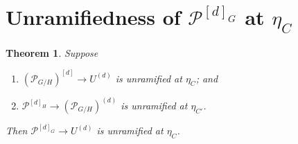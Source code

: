 \documentclass[12pt]{amsart}
\newcommand{\cP}{\mathcal{P}}
\newtheorem{thm}{Theorem}
\theoremstyle{remark}
\begin{document}
\section{Unramifiedness of $\cP^{[d]_G}$ at $\eta_C$}

\begin{thm}\label{thm:main}
Suppose
\begin{enumerate}
  \item[\textnormal{(H1)}] $(\cP_{G/H})^{[d]} \to U^{(d)}$ is unramified at
        $\eta_C$; and
  \item[\textnormal{(H2)}] $\cP^{[d]_H} \to (\cP_{G/H})^{(d)}$ is unramified
        at $\eta_{C'}$.
\end{enumerate}
Then $\cP^{[d]_G} \to U^{(d)}$ is unramified at $\eta_C$.
\end{thm}
\end{document}
